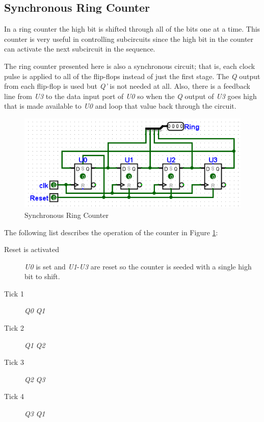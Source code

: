 \subsection{Synchronous Ring Counter}

In a ring counter the high bit is shifted through all of the bits one at a time. This counter is very useful in controlling subcircuits since the high bit in the counter can activate the next subcircuit in the sequence.

The ring counter presented here is also a synchronous circuit; that is, each clock pulse is applied to all of the flip-flops instead of just the first stage. The \textit{Q} output from each flip-flop is used but \textit{Q'} is not needed at all. Also, there is a feedback line from \textit{U3} to the data input port of \textit{U0} so when the \textit{Q} output of \textit{U3} goes high that is made available to \textit{U0} and loop that value back through the circuit.

\begin{figure}[H]
	\centering
	\includegraphics[width=\maxwidth{.95\linewidth}]{gfx/06-04}
	\caption{Synchronous Ring Counter}
	\label{fig:06-04}
\end{figure}

The following list describes the operation of the counter in Figure \ref{fig:06-04}:

\begin{description}
	\item [Reset is activated] \textit{U0} is set and \textit{U1}-\textit{U3} are reset so the counter is seeded with a single high bit to shift.
	
	\item [Tick 1] \textit{Q0} \textdownarrow \: \textemdash \: \textit{Q1} \textuparrow
	
	\item [Tick 2] \textit{Q1} \textdownarrow \: \textemdash \: \textit{Q2} \textuparrow
	
	\item [Tick 3] \textit{Q2} \textdownarrow \: \textemdash \: \textit{Q3} \textuparrow
	
	\item [Tick 4] \textit{Q3} \textdownarrow \: \textemdash \: \textit{Q1} \textuparrow
	
\end{description}

